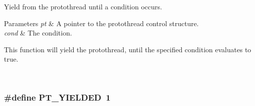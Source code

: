 Yield from the protothread until a condition occurs. 


\begin{DoxyParams}{Parameters}
{\em pt} & A pointer to the protothread control structure. \\
\hline
{\em cond} & The condition. \begin{DoxyVerb}        This function will yield the protothread, until the
        specified condition evaluates to true.\end{DoxyVerb}
 \\
\hline
\end{DoxyParams}
\hypertarget{group__pt_gae469332907e0617d72d5e2dd4297119d}{
\subsubsection[{P\+T\+\_\+\+Y\+I\+E\+L\+D\+E\+D}]{\setlength{\rightskip}{0pt plus 5cm}\#define P\+T\+\_\+\+Y\+I\+E\+L\+D\+E\+D~1}}\label{group__pt_gae469332907e0617d72d5e2dd4297119d}
